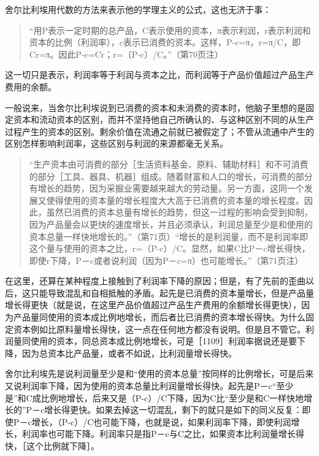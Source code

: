 舍尔比利埃用代数的方法来表示他的学理主义的公式，这也无济于事：

\begin{quote}{“用P表示一定时期的总产品，C表示使用的资本，π表示利润，r表示利润和资本的比例（利润率），c表示已消费的资本。这样，P-c=π，r=π/C，即Cr=π。因此P-c=Cr；r=（P-c）/C。”（第70页注）}\end{quote}

这一切只是表示，利润率等于利润与资本之比，而利润等于产品价值超过产品生产费用的余额。

一般说来，当舍尔比利埃说到已消费的资本和未消费的资本时，他脑子里想的是固定资本和流动资本的区别，而并不坚持他自己所确认的、与这种区别不同的从生产过程产生的资本的区别。剩余价值在流通之前就已被假定了；不管从流通中产生的区别怎样影响利润率，这些区别与利润的来源都毫无关系。

\begin{quote}{“生产资本由可消费的部分［生活资料基金、原料、辅助材料］和不可消费的部分［工具、器具、机器］组成。随着财富和人口的增长，可消费的部分有增长的趋势，因为采掘业需要越来越大的劳动量。另一方面，这同一个发展又使得使用的资本量的增长程度大大高于已消费的资本量的增长程度。因此，虽然已消费的资本总量有增长的趋势，但这一过程的影响会受到抑制，因为产品量会以更快的速度增长，并且必须承认，利润总量至少是和使用的资本总量一样快地增长的。”（第71页）“增长的是利润量，而不是利润率即这个量与使用的资本之比，r=（P-c）/C。显然，如果C比P－c增长得快，即使r下降，P－c或者说利润（因为P－c=π）也可能增长。”（第71页注）}\end{quote}

在这里，还算在某种程度上接触到了利润率下降的原因；但是，有了先前的歪曲以后，这只能导致混乱和自相抵触的矛盾。起先是已消费的资本量增长，但是产品量增长得更快（就是说，在这里产品价值超过产品生产费用的余额增长得更快），因为产品量同使用的资本成比例地增长，而后者比已消费的资本增长得快。为什么固定资本例如比原料量增长得快，这一点在任何地方都没有说明。但是且不管它。利润量同使用的资本，同总资本成比例地增长，可是［1109］利润率据说还是要下降，因为总资本比产品量，或者不如说，比利润量增长得快。

舍尔比利埃先是说利润量至少是和“使用的资本总量”按同样的比例增长，可是后来又说利润率下降，因为使用的资本总量比利润量增长得快。起先是P－c“至少是”和C成比例地增长，后来又是（P-c）/C下降，因为C比“至少是和C一样快地增长的”P－c增长得更快。如果去掉这一切混乱，剩下的就只是如下的同义反复：即使P－c增长，（P-c）/C也可能下降，也就是说，如果利润率下降，即使利润增长，利润率也可能下降。利润率只是指P－c与C之比，如果资本比利润量增长得快，［这个比例就下降］。

